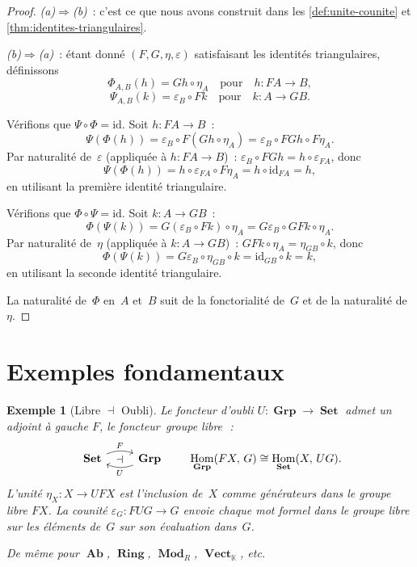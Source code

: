 \documentclass[a4paper,12pt]{book}
\DeclareMathOperator{\Hom}{Hom}
\DeclareMathOperator{\Set}{\mathbf{Set}}
\DeclareMathOperator{\Grp}{\mathbf{Grp}}
\DeclareMathOperator{\Ab}{\mathbf{Ab}}
\DeclareMathOperator{\Ring}{\mathbf{Ring}}
\DeclareMathOperator{\Vect}{\mathbf{Vect}}
\DeclareMathOperator{\Mod}{\mathbf{Mod}}
\newcommand{\id}{\mathrm{id}}
\newcommand{\K}{\mathbb{K}}
\newtheorem{exemple}[theoreme]{Exemple}
\providecommand{\og}{\guillemotleft\,}
\providecommand{\fg}{\,\guillemotright}
\begin{document}
\begin{proof}
\emph{(a)$\Rightarrow$(b)}~: c'est ce que nous avons construit dans les
\autoref{def:unite-counite} et \autoref{thm:identites-triangulaires}.

\emph{(b)$\Rightarrow$(a)}~: étant donné $(F,G,\eta,\varepsilon)$
satisfaisant les identités triangulaires, définissons
\[
    \Phi_{A,B}(h) = Gh\circ\eta_A
    \quad\text{pour}\quad h\colon FA\to B,
\]
\[
    \Psi_{A,B}(k) = \varepsilon_B\circ Fk
    \quad\text{pour}\quad k\colon A\to GB.
\]

Vérifions que $\Psi\circ\Phi = \id$.
Soit $h\colon FA\to B$~:
\[
    \Psi(\Phi(h))
    = \varepsilon_B\circ F(Gh\circ\eta_A)
    = \varepsilon_B\circ FGh\circ F\eta_A.
\]
Par naturalité de~$\varepsilon$ (appliquée à $h\colon FA\to B$)~:
$\varepsilon_B\circ FGh = h\circ\varepsilon_{FA}$, donc
\[
    \Psi(\Phi(h))
    = h\circ\varepsilon_{FA}\circ F\eta_A
    = h\circ\id_{FA} = h,
\]
en utilisant la première identité triangulaire.

Vérifions que $\Phi\circ\Psi=\id$.
Soit $k\colon A\to GB$~:
\[
    \Phi(\Psi(k))
    = G(\varepsilon_B\circ Fk)\circ\eta_A
    = G\varepsilon_B\circ GFk\circ\eta_A.
\]
Par naturalité de~$\eta$ (appliquée à $k\colon A\to GB$)~:
$GFk\circ\eta_A = \eta_{GB}\circ k$, donc
\[
    \Phi(\Psi(k))
    = G\varepsilon_B\circ\eta_{GB}\circ k
    = \id_{GB}\circ k = k,
\]
en utilisant la seconde identité triangulaire.

La naturalité de~$\Phi$ en~$A$ et~$B$ suit de la fonctorialité de~$G$
et de la naturalité de~$\eta$.
\end{proof}


\section{Exemples fondamentaux}\label{sec:exemples-adjonctions}

\begin{exemple}[Libre $\dashv$ Oubli]\label{ex:libre-oubli}
Le foncteur d'oubli $U\colon\Grp\to\Set$ admet un adjoint à gauche $F$,
le foncteur \og{}groupe libre\fg{}~:
\[
\begin{tikzcd}
\Set \arrow[r, bend left=20, "F", ""{name=A,below}]
& \Grp \arrow[l, bend left=20, "U", ""{name=B,above}]
\arrow[from=A, to=B, phantom, "\dashv"]
\end{tikzcd}
\qquad
\Hom_{\Grp}(FX,\,G) \cong \Hom_{\Set}(X,\,UG).
\]
L'unité $\eta_X\colon X\to UFX$ est l'inclusion de~$X$ comme
générateurs dans le groupe libre $FX$. La counité
$\varepsilon_G\colon FUG\to G$ envoie chaque mot formel dans
le groupe libre sur les éléments de~$G$ sur son évaluation dans~$G$.

De même pour $\Ab$, $\Ring$, $\Mod_R$, $\Vect_\K$, etc.
\end{exemple}
\end{document}
